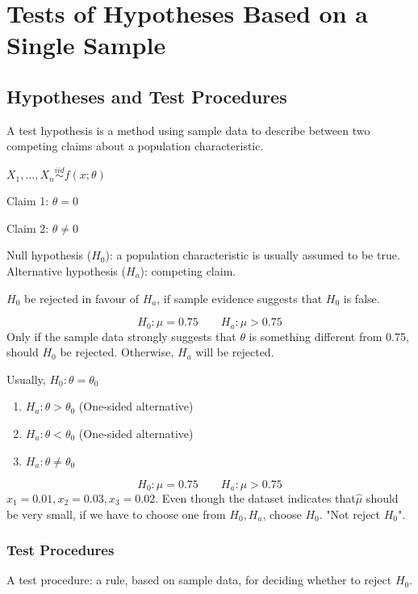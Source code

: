 \chapter{Tests of Hypotheses Based on a Single Sample}
\section{Hypotheses and Test Procedures}
A test hypothesis is a method using sample data to describe between two competing claims about a population characteristic.

\begin{exmp}
$X_1,\dots,X_n \overset{iid}{\sim} f(x;\theta)$

Claim 1: $\theta=0$

Claim 2: $\theta\neq 0$
\end{exmp}

\begin{defn}
Null hypothesis ($H_0$): a population characteristic is usually assumed to be true. Alternative hypothesis ($H_a$): competing claim.

$H_0$ be rejected in favour of $H_a$, if sample evidence suggests that $H_0$ is false.
\end{defn}

\begin{exmp}
\[H_0:\mu=0.75 \qquad H_a:\mu>0.75\]
Only if the sample data strongly suggests that $\theta$ is something different from 0.75, should $H_0$ be rejected. Otherwise, $H_a$ will be rejected.
\end{exmp}

Usually, $H_0:\theta=\theta_0$
\begin{enumerate}
\item $H_a:\theta > \theta_0$ (One-sided alternative)
\item $H_a:\theta <\theta_0$ (One-sided alternative)
\item $H_a:\theta \neq \theta_0$
\end{enumerate}

\begin{exmp}
\[H_0:\mu=0.75 \qquad H_a:\mu>0.75\]
$x_1=0.01,x_2=0.03,x_3=0.02$. Even though the dataset indicates that$\hat{\mu}$ should be very small, if we have to choose one from $H_0,H_a$, choose $H_0$. "Not reject $H_0$".
\end{exmp}


\subsection{Test Procedures}
A test procedure: a rule, based on sample data, for deciding whether to reject $H_0$.

